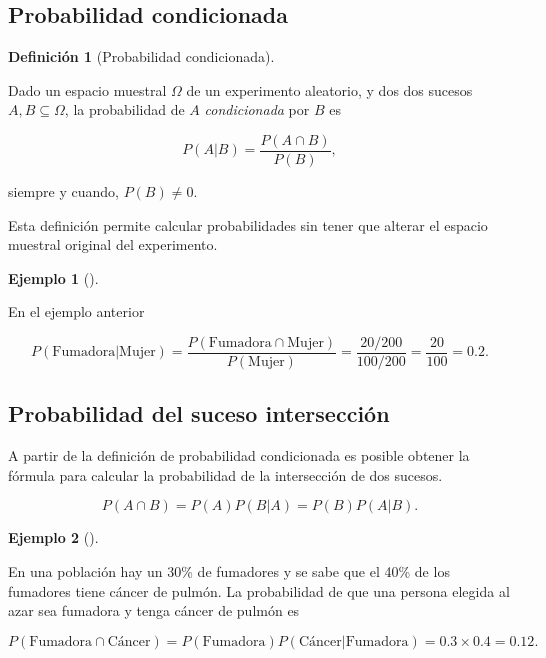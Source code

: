 \documentclass[
  spanish,
  a4paper,
]{scrreport}
\theoremstyle{plain}
\theoremstyle{definition}
\newtheorem{example}{Ejemplo}[chapter]
\theoremstyle{definition}
\newtheorem{definition}{Definición}[chapter]
\theoremstyle{remark}
\begin{document}
\subsection{Probabilidad
condicionada}\label{probabilidad-condicionada-1}

\begin{definition}[Probabilidad
condicionada]\protect\hypertarget{def-probabilidad-condicionada}{}\label{def-probabilidad-condicionada}

Dado un espacio muestral \(\Omega\) de un experimento aleatorio, y dos
dos sucesos \(A,B\subseteq \Omega\), la probabilidad de \(A\)
\emph{condicionada} por \(B\) es

\[P(A|B) = \frac{P(A\cap B)}{P(B)},\]

siempre y cuando, \(P(B)\neq 0\).

\end{definition}

Esta definición permite calcular probabilidades sin tener que alterar el
espacio muestral original del experimento.

\begin{example}[]\protect\hypertarget{exm-probabilidad-condicionada}{}\label{exm-probabilidad-condicionada}

En el ejemplo anterior

\[P(\mbox{Fumadora}|\mbox{Mujer})= \frac{P(\mbox{Fumadora}\cap \mbox{Mujer})}{P(\mbox{Mujer})} =  \frac{20/200}{100/200}=\frac{20}{100}=0.2.\]

\end{example}

\subsection{Probabilidad del suceso
intersección}\label{probabilidad-del-suceso-intersecciuxf3n}

A partir de la definición de probabilidad condicionada es posible
obtener la fórmula para calcular la probabilidad de la intersección de
dos sucesos.

\[P(A\cap B) = P(A)P(B|A) = P(B)P(A|B).\]

\begin{example}[]\protect\hypertarget{exm-probabilidad-interseccion}{}\label{exm-probabilidad-interseccion}

En una población hay un 30\% de fumadores y se sabe que el 40\% de los
fumadores tiene cáncer de pulmón. La probabilidad de que una persona
elegida al azar sea fumadora y tenga cáncer de pulmón es

\[P(\mbox{Fumadora}\cap \mbox{Cáncer})= P(\mbox{Fumadora})P(\mbox{Cáncer}|\mbox{Fumadora}) = 0.3\times 0.4 = 0.12.\]

\end{example}
\end{document}
